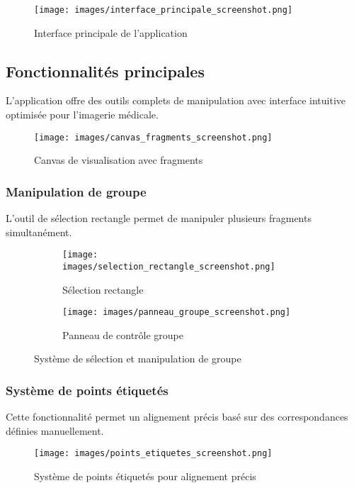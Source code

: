 \documentclass[12pt,a4paper]{report}
\begin{document}
\begin{figure}[h!]
\centering
\texttt{[image: images/interface\_principale\_screenshot.png]}
\caption{Interface principale de l'application}
\end{figure}

\subsection{Fonctionnalités principales}

L'application offre des outils complets de manipulation avec interface intuitive optimisée pour l'imagerie médicale.

\begin{figure}[h!]
\centering
\texttt{[image: images/canvas\_fragments\_screenshot.png]}
\caption{Canvas de visualisation avec fragments}
\end{figure}

\subsubsection{Manipulation de groupe}

L'outil de sélection rectangle permet de manipuler plusieurs fragments simultanément.

\begin{figure}[h!]
\centering
\begin{subfigure}{0.48\textwidth}
\texttt{[image: images/selection\_rectangle\_screenshot.png]}
\caption{Sélection rectangle}
\end{subfigure}
\hfill
\begin{subfigure}{0.48\textwidth}
\texttt{[image: images/panneau\_groupe\_screenshot.png]}
\caption{Panneau de contrôle groupe}
\end{subfigure}
\caption{Système de sélection et manipulation de groupe}
\end{figure}

\subsubsection{Système de points étiquetés}

Cette fonctionnalité permet un alignement précis basé sur des correspondances définies manuellement.

\begin{figure}[h!]
\centering
\texttt{[image: images/points\_etiquetes\_screenshot.png]}
\caption{Système de points étiquetés pour alignement précis}
\end{figure}
\end{document}
